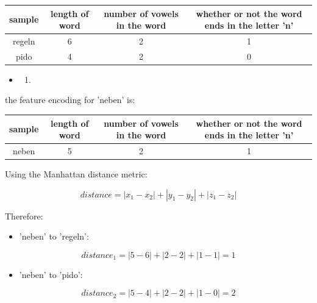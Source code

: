 \documentclass[11pt]{article}
\providecommand{\tightlist}{%
      \setlength{\itemsep}{0pt}\setlength{\parskip}{0pt}}
\begin{document}
\begin{center}
	\begin{tabular}{||c |c |c | c||} 
		\hline
		sample & length of word & number of vowels in the word & whether or not the word ends in the letter 'n'\\ [0.5ex] 
		\hline\hline
		regeln & 6 & 2 & 1 \\ 
		\hline
		pido & 4 & 2 & 0 \\
		\hline
	\end{tabular}
\end{center}

\begin{itemize}
\item
  \begin{enumerate}
  \def\labelenumi{(\alph{enumi})}
  \setcounter{enumi}{2}
  \item
  \end{enumerate}
\end{itemize}

the feature encoding for 'neben' is:

\begin{center}
	\begin{tabular}{||c |c |c | c||} 
		\hline
		sample & length of word & number of vowels in the word & whether or not the word ends in the letter 'n'\\ [0.5ex] 
		\hline\hline
		neben & 5 & 2 & 1 \\ 
		\hline
	\end{tabular}
\end{center}




Using the Manhattan distance metric:

\[distance = \left|x_{1}-x_{2}\right|+\left|y_{1}-y_{2}\right|+\left|z_{1}-z_{2}\right|\]

Therefore:

\begin{itemize}
\tightlist
\item
  'neben' to 'regeln':
\end{itemize}

\[distance_1 = \left|5-6\right|+\left|2-2\right|+\left|1-1\right| = 1\]

\begin{itemize}
\tightlist
\item
  'neben' to 'pido':
\end{itemize}

\[distance_2 = \left|5-4\right|+\left|2-2\right|+\left|1-0\right| = 2\]
\end{document}
